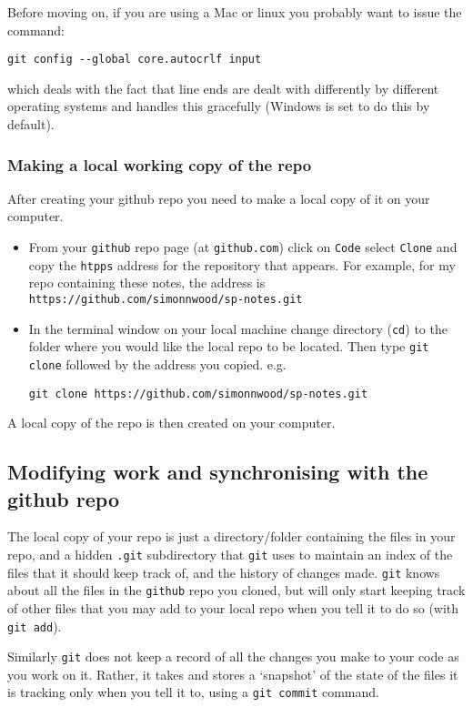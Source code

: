 \documentclass[10pt] {article}
\theoremstyle{definition}
\begin{document}
Before moving on, if you are using a Mac or linux you probably want to issue the command:
\begin{verbatim}
git config --global core.autocrlf input
\end{verbatim}
which deals with the fact that line ends are dealt with differently by different operating systems and handles this gracefully (Windows is set to do this by default).

\subsubsection{Making a local working copy of the repo}

After creating your github repo you need to make a local copy of it on your computer. 
\begin{itemize}
\item From your {\tt github} repo page (at {\tt github.com}) click on {\tt Code} select {\tt Clone} and copy the {\tt htpps} address for the repository that appears. For example, for my repo containing these notes, the address is \verb+https://github.com/simonnwood/sp-notes.git+
\item In the terminal window on your local machine change directory ({\tt cd}) to the folder where you would like the local repo to be located. Then type {\tt git clone} followed by the address you copied. e.g. 
\begin{verbatim}
git clone https://github.com/simonnwood/sp-notes.git
\end{verbatim}
\end{itemize}
A local copy of the repo is then created on your computer. 

\subsection{Modifying work and synchronising with the github repo}

The local copy of your repo is just a directory/folder containing the files in your repo, and a hidden {\tt .git} subdirectory that {\tt git} uses to maintain an index of the files that it should keep track of, and the history of changes made. {\tt git} knows about all the files in the {\tt github} repo you cloned, but will only start keeping track of other files that you may add to your local repo when you tell it to do so (with \verb+git add+). 

Similarly {\tt git} does not keep a record of all the changes you make to your code as you work on it. Rather, it takes and stores a `snapshot' of the state of the files it is tracking only when you tell it to, using a {\tt git commit} command. 
\end{document}

